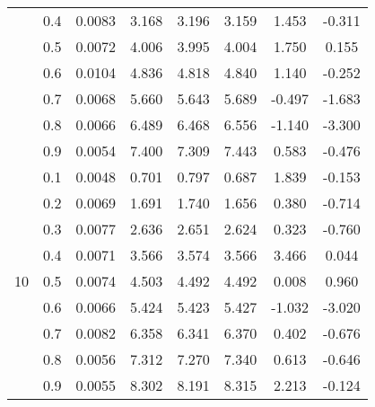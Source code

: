\documentclass[11pt,a4paper]{report}
\begin{document}
\begin{longtable}{ | c | c || c | c | c | c | c | c | }
 & 0.4 & 0.0083 & 3.168 & 3.196 & 3.159 & 1.453 & -0.311 \\
 & 0.5 & 0.0072 & 4.006 & 3.995 & 4.004 & 1.750 & 0.155 \\
 & 0.6 & 0.0104 & 4.836 & 4.818 & 4.840 & 1.140 & -0.252 \\
 & 0.7 & 0.0068 & 5.660 & 5.643 & 5.689 & -0.497 & -1.683 \\
 & 0.8 & 0.0066 & 6.489 & 6.468 & 6.556 & -1.140 & -3.300 \\
 & 0.9 & 0.0054 & 7.400 & 7.309 & 7.443 & 0.583 & -0.476 \\
 \hline
\multirow{9}{*}{10} & 0.1 & 0.0048 & 0.701 & 0.797 & 0.687 & 1.839 & -0.153 \\
 & 0.2 & 0.0069 & 1.691 & 1.740 & 1.656 & 0.380 & -0.714 \\
 & 0.3 & 0.0077 & 2.636 & 2.651 & 2.624 & 0.323 & -0.760 \\
 & 0.4 & 0.0071 & 3.566 & 3.574 & 3.566 & 3.466 & 0.044 \\
 & 0.5 & 0.0074 & 4.503 & 4.492 & 4.492 & 0.008 & 0.960 \\
 & 0.6 & 0.0066 & 5.424 & 5.423 & 5.427 & -1.032 & -3.020 \\
 & 0.7 & 0.0082 & 6.358 & 6.341 & 6.370 & 0.402 & -0.676 \\
 & 0.8 & 0.0056 & 7.312 & 7.270 & 7.340 & 0.613 & -0.646 \\
 & 0.9 & 0.0055 & 8.302 & 8.191 & 8.315 & 2.213 & -0.124 \\
 \hline
\hline
\end{longtable}
\end{document}
